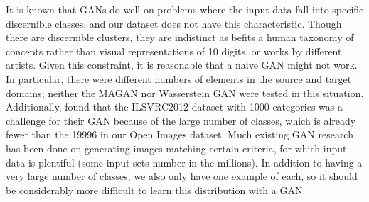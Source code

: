 It is known that GANs do well on problems where the input data fall into specific discernible classes, and our dataset does not have this characteristic. Though there are discernible clusters, they are indistinct as befits a human taxonomy of concepts rather than visual representations of 10 digits, or works by different artists. Given this constraint, it is reasonable that a naive GAN might not work. In particular, there were different numbers of elements in the source and target domains; neither the MAGAN nor Wasserstein GAN were tested in this situation. Additionally, \cite{ImprovedTechniquesTrainingGANS} found that the ILSVRC2012 dataset with 1000 categories was a challenge for their GAN because of the large number of classes, which is already fewer than the 19996 in our Open Images dataset. Much existing GAN research has been done on generating images matching certain criteria, for which input data is plentiful (some input sets number in the millions). In addition to having a very large number of classes, we also only have one example of each, so it should be considerably more difficult to learn this distribution with a GAN. 

